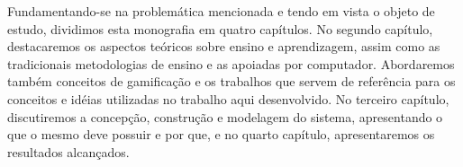 Fundamentando-se na problemática mencionada e tendo em vista o objeto de estudo, dividimos esta monografia em quatro capítulos. No 
segundo cap\'itulo, destacaremos os aspectos teóricos sobre ensino e aprendizagem, assim como as tradicionais metodologias de ensino e as 
apoiadas por computador. Abordaremos tamb\'em conceitos de gamificação e os trabalhos que servem de refer\^encia para os conceitos e 
id\'eias utilizadas no trabalho aqui desenvolvido. No terceiro capítulo, discutiremos a concepção, construção e modelagem do sistema, 
apresentando o que o mesmo deve possuir e por que, e no quarto capítulo, apresentaremos os resultados alcan\c{c}ados.